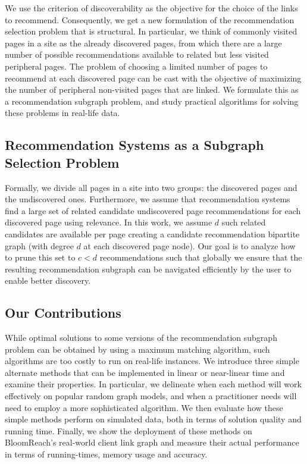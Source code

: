 We use the criterion of discoverability as the objective for the choice of the links to recommend. Consequently, we get a new formulation of the recommendation selection problem that is structural. In particular, we think of commonly visited pages in a site as the already discovered pages, from which there are a large number of possible recommendations available to related but less visited peripheral pages. The problem of choosing a limited number of pages to recommend at each discovered page can be cast with the objective of maximizing the number of peripheral non-visited pages that are linked. We formulate this as a recommendation subgraph problem, and study practical algorithms for solving these problems in real-life data.

\subsection{Recommendation Systems as a Subgraph Selection Problem}

Formally, we divide all pages in a site into two groups: the discovered pages and the undiscovered ones.
Furthermore, we assume that recommendation systems~\cite{Schafer1999, Adomavicius2005,
  Resnick1997} find a large set of related candidate undiscovered page recommendations
for each discovered page using relevance. In this work, we assume $d$
such related candidates are available per page creating a candidate recommendation bipartite graph 
(with degree $d$ at each discovered page node).
Our goal is to analyze how to prune this set to $c < d$ recommendations such that
globally we ensure that the resulting recommendation subgraph can be navigated efficiently by the user to enable better discovery.

\subsection{Our Contributions}
While optimal solutions to some versions of the recommendation subgraph problem can be obtained by using a maximum matching algorithm, such algorithms are too costly to run on real-life instances. We introduce three simple alternate methods that can be implemented in linear or near-linear time and examine their properties. 
In particular, we delineate when
each method will work effectively on popular random graph models, and when a practitioner needs will need to employ a more sophisticated algorithm. 
We then evaluate how these simple methods perform on simulated data, both in terms of solution quality and  running time.
Finally, we show the deployment of these methods on BloomReach's real-world client link graph and measure their
actual performance in terms of running-times, memory usage and accuracy.

